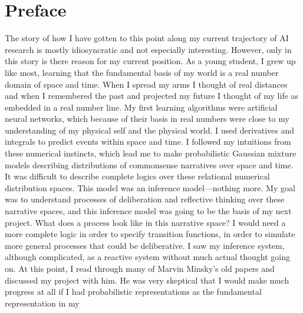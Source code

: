 

\chapter*{Preface}

The story of how I have gotten to this point along my current
trajectory of AI research is mostly idiosyncratic and not especially
interesting.  However, only in this story is there reason for my
current position.  As a young student, I grew up like most, learning
that the fundamental basis of my world is a real number domain of
space and time.  When I spread my arms I thought of real distances and
when I remembered the past and projected my future I thought of my
life as embedded in a real number line.  My first learning algorithms
were artificial neural networks, which because of their basis in real
numbers were close to my understanding of my physical self and the
physical world.  I used derivatives and integrals to predict events
within space and time.  I followed my intuitions from these numerical
instincts, which lead me to make probabilistic Gaussian mixture models
describing distributions of commonsense narratives over space and
time.  It was difficult to describe complete logics over these
relational numerical distribution spaces.  This model was an inference
model---nothing more.  My goal was to understand processes of
deliberation and reflective thinking over these narrative spaces, and
this inference model was going to be the basis of my next project.
What does a process look like in this narrative space?  I would need a
more complete logic in order to specify transition functions, in order
to simulate more general processes that could be deliberative.  I saw
my inference system, although complicated, as a reactive system
without much actual thought going on.  At this point, I read through
many of Marvin Minsky's old papers and discussed my project with him.
He was very skeptical that I would make much progress at all if I had
probabilistic representations as the fundamental representation in my

